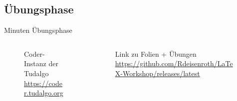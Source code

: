 \documentclass[
    ngerman,
    accentcolor=3b,
    dark_mode,
    fontsize= 12pt,
    a4paper,
    aspectratio=169,
    colorback=true,
    fancy_row_colors,
    leqno,
    fleqn,
    boxarc=3pt,
    fleqn,
]{algoslides}
\begin{document}
    \subsection{Übungsphase}
    \begin{frame}[c]
        \slidehead{}
         Minuten Übungsphase
        \begin{columns}[c]
            \begin{column}{.5\textwidth}
                \begin{figure}
                    \centering
                    \caption{Coder-Instanz der Tudalgo\\\url{https://coder.tudalgo.org}}
                \end{figure}
            \end{column}%
            \begin{column}{.5\textwidth}
                \begin{figure}
                    \centering
                    \caption{Link zu Folien + Übungen\\\url{https://github.com/Rdeisenroth/LaTeX-Workshop/releases/latest}}
                \end{figure}
            \end{column}
        \end{columns}
    \end{frame}
\end{document}
